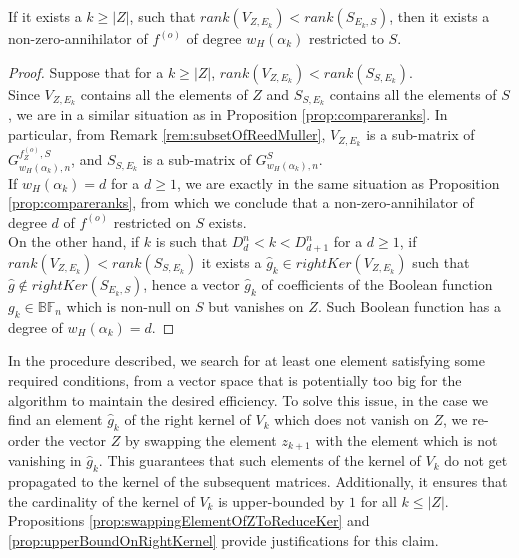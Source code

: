 \documentclass[11pt]{llncs}
\begin{document}
\begin{proposition}\label{prop:comparsonVandSAfterAllelementsofZ}
    If it exists a $k \geq |Z|$, such that $rank\left(V_{Z, E_k}\right) < rank\left(S_{E_k,S}\right)$, then it exists a non-zero-annihilator of $f^{(o)}$ of degree $w_H\left(\alpha_k\right)$ restricted to $S$.
\end{proposition}
\begin{proof}
    Suppose that for a $k \geq |Z|$, $rank\left(V_{Z, E_k}\right) < rank\left(S_{S,E_k}\right)$.\\
    Since $V_{Z,E_k}$ contains all the elements of $Z$ and $S_{S,E_k}$ contains all the elements of $S$, we are in a similar situation as in Proposition \ref{prop:compareranks}. In particular, from Remark \ref{rem:subsetOfReedMuller}, $V_{Z,E_k}$ is a sub-matrix of $G_{w_H\left(\alpha_k\right), n}^{f_Z^{(o)}, S}$, and $S_{S,E_k}$ is a sub-matrix of $G_{w_H\left(\alpha_k\right), n}^{S}$.\\
    If $w_H\left(\alpha_k\right) = d$ for a $d\geq 1$, we are exactly in the same situation as Proposition \ref{prop:compareranks}, from which we conclude that a non-zero-annihilator of degree $d$ of $f^{(o)}$ restricted on $S$ exists.\\
    On the other hand, if $k$ is such that $D_{d}^n < k < D_{d+1}^n$ for a $d \geq 1$, if $rank\left(V_{Z, E_k}\right) < rank\left(S_{S, E_k}\right)$ it exists a $\hat{g}_k \in rightKer\left(V_{Z, E_k}\right)$ such that $\hat{g} \not\in rightKer\left(S_{E_k, S}\right)$, hence a vector $\hat{g}_k$ of coefficients of the Boolean function $g_k \in \mathbb{BF}_n$ which is non-null on $S$ but vanishes on $Z$. Such Boolean function has a degree of $w_H\left(\alpha_k\right) = d$.
\end{proof}


\begin{remark}
    In the procedure described, we search for at least one element satisfying some required conditions, from a vector space that is potentially too big for the algorithm to maintain the desired efficiency. To solve this issue, in the case we find an element $\hat{g}_k$ of the right kernel of $V_k$ which does not vanish on $Z$, we re-order the vector $Z$ by swapping the element $z_{k+1}$ with the element which is not vanishing in $\hat{g}_k$. This guarantees that such elements of the kernel of $V_k$ do not get propagated to the kernel of the subsequent matrices. Additionally, it ensures that the cardinality of the kernel of $V_k$ is upper-bounded by $1$ for all $k \leq |Z|$.\\
    Propositions \ref{prop:swappingElementOfZToReduceKer} and \ref{prop:upperBoundOnRightKernel} provide justifications for this claim.
\end{remark}
\end{document}
